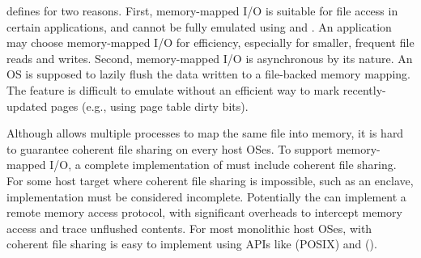 \Thehostabi{} defines  for two reasons. First, memory-mapped I/O is suitable for file access in certain applications, and cannot be fully emulated
using  and .
An application may choose memory-mapped I/O for
efficiency, %
especially for smaller, frequent file reads and writes.
Second, memory-mapped I/O is asynchronous by its nature.
An OS is supposed to lazily flush the data written to a file-backed memory mapping.
The feature is difficult to emulate
without an efficient way to mark recently-updated pages (e.g., using page table dirty bits).






Although  allows multiple processes to map the same file into memory, it is hard to guarantee coherent file sharing on every host OSes.
To support memory-mapped I/O,
a complete implementation of \thehostabi{}
must include coherent file sharing. 
For some host target where coherent file sharing is impossible,
such as an \sgx{} enclave,
\thehostabi{} implementation must be considered incomplete.
Potentially the \libos{} can implement a remote memory access protocol, with significant overheads to intercept memory access and trace unflushed contents.  
For most monolithic host OSes,
 with coherent file sharing
is easy to implement using APIs like  (POSIX) and  (\win{}).
 


